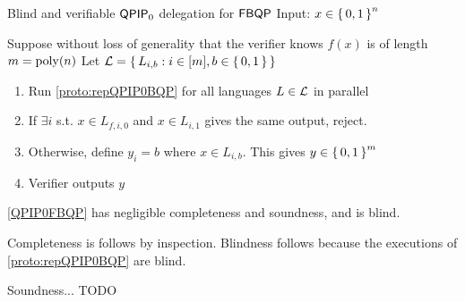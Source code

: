 \begin{protocol}{Blind and verifiable $\operatorname{\mathsf{QPIP}}_0$ delegation for $\operatorname{\mathsf{FBQP}}$}
	\label{QPIP0FBQP}
	Input: $x\in\set{0, 1}^n$

	Suppose without loss of generality that the verifier knows $f(x)$ is of length $m=\operatorname*{\operatorname{poly}}(n)$ 
	Let ${\cal L} = \set{L_{i, b}: i\in[m], b\in\set{0, 1}}$
	\begin{enumerate}
		\item Run \cref{proto:repQPIP0BQP} for all languages $L\in{\cal L}$ in parallel
		\item If $\exists i$ s.t. $x\in L_{f, i, 0}$ and $x\in L_{i, 1}$ gives the same output, reject.
		\item Otherwise, define $y_i = b$ where $x\in L_{i, b}$. This gives $y\in\set{0,1}^m$
		\item Verifier outputs $y$
	\end{enumerate}
\end{protocol}

\begin{theorem}
	\cref{QPIP0FBQP} has negligible completeness and soundness, and is blind.
\end{theorem}
\begin{prf}
	Completeness is follows by inspection.
	Blindness follows because the executions of \cref{proto:repQPIP0BQP} are blind.

	Soundness... TODO
\end{prf}
